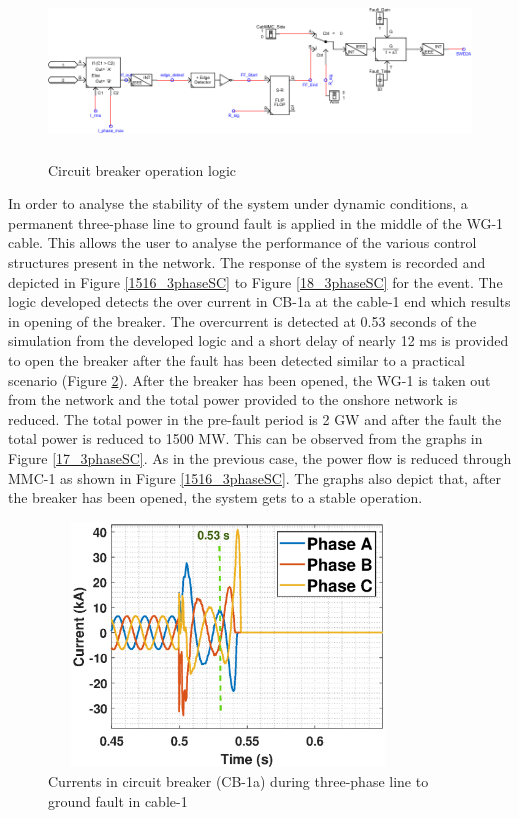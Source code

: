 \begin{figure}[H]
\centering
    \includegraphics[height = 4.5cm,width = 14.5cm]{Diagrams/Chapter_5/Fault_logic_New.pdf}
    \caption{Circuit breaker operation logic}
    \label{fig:Fault_logic}
\end{figure}

In order to analyse the stability of the system under dynamic conditions, a permanent three-phase line to ground fault is applied in the middle of the \gls{WG}-1 cable. This allows the user to analyse the performance of the various control structures present in the network. The response of the system is recorded and depicted in Figure \ref{1516_3phaseSC} to Figure \ref{18_3phaseSC} for the event. The logic developed detects the over current in CB-1a at the cable-1 end which results in opening of the breaker. The overcurrent is detected at 0.53 seconds of the simulation from the developed logic and a short delay of nearly 12 ms is provided to open the breaker after the fault has been detected similar to a practical scenario (Figure \ref{Circuit_breaker_3phasefault}). After the breaker has been opened, the \gls{WG}-1 is taken out from the network and the total power provided to the onshore network is reduced. The total power in the pre-fault period is 2 GW and after the fault the total power is reduced to 1500 MW. This can be observed from the graphs in Figure \ref{17_3phaseSC}. As in the previous case, the power flow is reduced through \gls{MMC}-1 as shown in Figure \ref{1516_3phaseSC}. The graphs also depict that, after the breaker has been opened, the system gets to a stable operation. 

\begin{figure}[H]
\centering
    \includegraphics[height = 6.5cm,width = 9.5cm]{Diagrams/Chapter_5/IABC_CB_3phaseSC_new_2.eps}
    \caption{Currents in circuit breaker (CB-1a) during three-phase line to ground fault in cable-1}
    \label{Circuit_breaker_3phasefault}
\end{figure}

